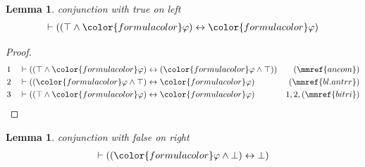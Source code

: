 \documentclass{article}
\theoremstyle{plain}
\newtheorem{lemma}{Theorem}[section]
\newtheorem{lemma}[theorem]{Lemma}
\begin{document}
\begin{lemma} conjunction with true on left
\begin{align}
\vdash ( ( \top \wedge {\color{formulacolor}\varphi} ) \leftrightarrow
    {\color{formulacolor}\varphi} )\label{bl.antrl}
\end{align}
\end{lemma}

\begin{proof}
\begin{align}
  1 && & \vdash ( ( \top \wedge {\color{formulacolor}\varphi} ) \leftrightarrow
      ( {\color{formulacolor}\varphi} \wedge \top )
      )&(\mmref{ancom})\notag
  \\ 2 && & \vdash ( ( {\color{formulacolor}\varphi} \wedge \top )
      \leftrightarrow {\color{formulacolor}\varphi}
      )&(\mmref{bl.antrr})\notag
  \\ 3 && & \vdash ( ( \top \wedge {\color{formulacolor}\varphi} )
      \leftrightarrow {\color{formulacolor}\varphi}
      )&1,2,(\mmref{bitri})\notag
\end{align}
\end{proof}

\begin{lemma} conjunction with false on right
\begin{align}
\vdash ( ( {\color{formulacolor}\varphi} \wedge \bot ) \leftrightarrow \bot
    )\label{bl.anfar}
\end{align}
\end{lemma}
\end{document}

